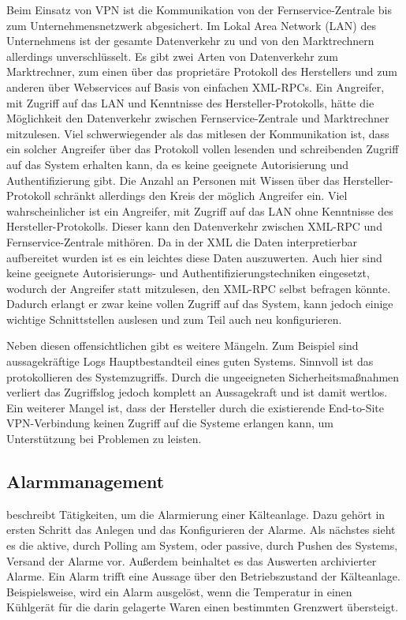 \documentclass[11pt,a4paper]{report}
\begin{document}
Beim Einsatz von VPN ist die Kommunikation von der Fernservice-Zentrale bis zum Unternehmensnetzwerk abgesichert. Im Lokal Area Network (LAN) des Unternehmens ist der gesamte Datenverkehr zu und von den Marktrechnern allerdings unverschlüsselt. Es gibt zwei Arten von Datenverkehr zum Marktrechner, zum einen über das proprietäre Protokoll des Herstellers und zum anderen über Webservices auf Basis von einfachen XML-RPCs. Ein Angreifer, mit Zugriff auf das LAN und Kenntnisse des Hersteller-Protokolls, hätte die Möglichkeit den Datenverkehr zwischen Fernservice-Zentrale und Marktrechner mitzulesen. Viel schwerwiegender als das mitlesen der Kommunikation ist, dass ein solcher Angreifer über das Protokoll vollen lesenden und schreibenden Zugriff auf das System erhalten kann, da es keine geeignete Autorisierung und Authentifizierung gibt. Die Anzahl an Personen mit Wissen über das Hersteller-Protokoll schränkt allerdings den Kreis der möglich Angreifer ein. Viel wahrscheinlicher ist ein Angreifer, mit Zugriff auf das LAN ohne Kenntnisse des Hersteller-Protokolls. Dieser kann den Datenverkehr zwischen XML-RPC und Fernservice-Zentrale mithören. Da in der XML die Daten interpretierbar aufbereitet wurden ist es ein leichtes diese Daten auszuwerten. Auch hier sind keine geeignete Autorisierungs- und Authentifizierungstechniken eingesetzt, wodurch der Angreifer statt mitzulesen, den XML-RPC selbst befragen könnte. Dadurch erlangt er zwar keine vollen Zugriff auf das System, kann jedoch einige wichtige Schnittstellen auslesen und zum Teil auch neu konfigurieren. 

Neben diesen offensichtlichen gibt es weitere Mängeln. Zum Beispiel sind aussagekräftige Logs Hauptbestandteil eines guten Systems. Sinnvoll ist das protokollieren des Systemzugriffs. Durch die ungeeigneten Sicherheitsmaßnahmen verliert das Zugriffslog jedoch komplett an Aussagekraft und ist damit wertlos. Ein weiterer Mangel ist, dass der Hersteller durch die existierende End-to-Site VPN-Verbindung keinen Zugriff auf die Systeme erlangen kann, um Unterstützung bei Problemen zu leisten. 

\subsection{Alarmmanagement} beschreibt Tätigkeiten, um die Alarmierung einer Kälteanlage. Dazu gehört in ersten Schritt das Anlegen und das Konfigurieren der Alarme. Als nächstes sieht es die aktive, durch Polling am System, oder passive, durch Pushen des Systems, Versand der Alarme vor. Außerdem beinhaltet es das Auswerten archivierter Alarme. Ein Alarm trifft eine Aussage über den Betriebszustand der Kälteanlage. Beispielsweise, wird ein Alarm ausgelöst, wenn die Temperatur in einen Kühlgerät für die darin gelagerte Waren einen bestimmten Grenzwert übersteigt.
\end{document}
